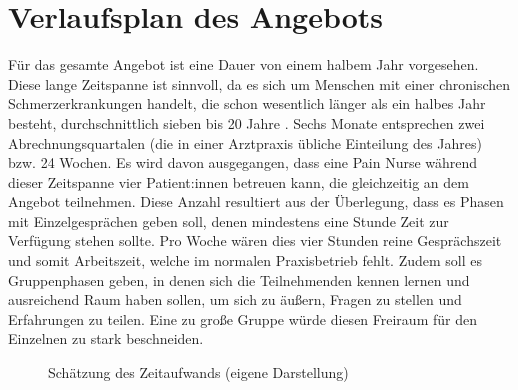 \documentclass[
  twoside,
  parskip=half-,
]{scrreprt}
\begin{document}
\section{Verlaufsplan des Angebots}\label{sec:ablaufplan}
Für das gesamte Angebot ist eine Dauer von einem halbem Jahr vorgesehen. Diese lange Zeitspanne ist sinnvoll, da es sich um Menschen mit einer chronischen Schmerzerkrankungen handelt, die schon wesentlich länger als ein halbes Jahr besteht, durchschnittlich sieben bis 20 Jahre \autocite[vgl.][]{Schmerzgesellschaft}. Sechs Monate entsprechen zwei Abrechnungsquartalen (die in einer Arztpraxis übliche Einteilung des Jahres) bzw. 24 Wochen. Es wird davon ausgegangen, dass eine Pain Nurse während dieser Zeitspanne vier Patient:innen betreuen kann, die gleichzeitig an dem Angebot teilnehmen. Diese Anzahl resultiert aus der Überlegung, dass es Phasen mit Einzelgesprächen geben soll, denen mindestens eine Stunde Zeit zur Verfügung stehen sollte. Pro Woche wären dies vier Stunden reine Gesprächszeit und somit Arbeitszeit, welche im normalen Praxisbetrieb fehlt. Zudem soll es Gruppenphasen geben, in denen sich die Teilnehmenden kennen lernen und ausreichend Raum haben sollen, um sich zu äußern, Fragen zu stellen und Erfahrungen zu teilen. Eine zu große Gruppe würde diesen Freiraum für den Einzelnen zu stark beschneiden.

\begin{figure}[h!]
\centering
{}
\caption{Schätzung des Zeitaufwands (eigene Darstellung)}
\label{fig:zeitaufwand}
\end{figure}
\end{document}
